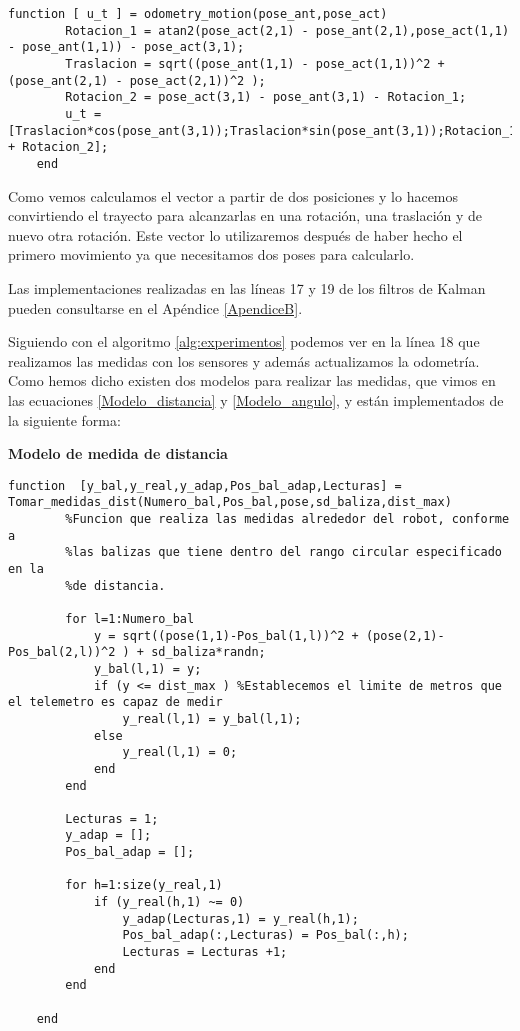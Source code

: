 \lstset{language=Matlab, breaklines=true, basicstyle=\footnotesize}
\lstset{numbers=left, numberstyle=\tiny, stepnumber=1, numbersep=-2pt}
\begin{lstlisting}[frame=single]
function [ u_t ] = odometry_motion(pose_ant,pose_act)
        Rotacion_1 = atan2(pose_act(2,1) - pose_ant(2,1),pose_act(1,1) - pose_ant(1,1)) - pose_act(3,1);
        Traslacion = sqrt((pose_ant(1,1) - pose_act(1,1))^2 + (pose_ant(2,1) - pose_act(2,1))^2 );
        Rotacion_2 = pose_act(3,1) - pose_ant(3,1) - Rotacion_1;
        u_t = [Traslacion*cos(pose_ant(3,1));Traslacion*sin(pose_ant(3,1));Rotacion_1 + Rotacion_2];
    end
\end{lstlisting}
Como vemos calculamos el vector a partir de dos posiciones y lo hacemos convirtiendo el trayecto para alcanzarlas en una rotación, una traslación y de nuevo otra rotación.
Este vector lo utilizaremos después de haber hecho el primero movimiento ya que necesitamos dos poses para calcularlo.

Las implementaciones realizadas en las líneas 17 y 19 de los filtros de Kalman pueden consultarse en el Apéndice \ref{ApendiceB}.

Siguiendo con el algoritmo \ref{alg:experimentos} podemos ver en la línea 18 que realizamos las medidas con los sensores y además actualizamos la odometría.
Como hemos dicho existen dos modelos para realizar las medidas, que vimos en las ecuaciones \ref{Modelo_distancia} y \ref{Modelo_angulo}, y están implementados de la siguiente forma:

\textbf{Modelo de medida de distancia}
\begin{lstlisting}[frame=single]
function  [y_bal,y_real,y_adap,Pos_bal_adap,Lecturas] = Tomar_medidas_dist(Numero_bal,Pos_bal,pose,sd_baliza,dist_max)
        %Funcion que realiza las medidas alrededor del robot, conforme a
        %las balizas que tiene dentro del rango circular especificado en la
        %de distancia.
        
        for l=1:Numero_bal
            y = sqrt((pose(1,1)-Pos_bal(1,l))^2 + (pose(2,1)-Pos_bal(2,l))^2 ) + sd_baliza*randn;
            y_bal(l,1) = y;
            if (y <= dist_max ) %Establecemos el limite de metros que el telemetro es capaz de medir
                y_real(l,1) = y_bal(l,1);
            else
                y_real(l,1) = 0;
            end
        end
        
        Lecturas = 1;
        y_adap = [];
        Pos_bal_adap = [];
        
        for h=1:size(y_real,1)
            if (y_real(h,1) ~= 0)
                y_adap(Lecturas,1) = y_real(h,1);
                Pos_bal_adap(:,Lecturas) = Pos_bal(:,h);
                Lecturas = Lecturas +1;
            end
        end
            
    end
\end{lstlisting}

